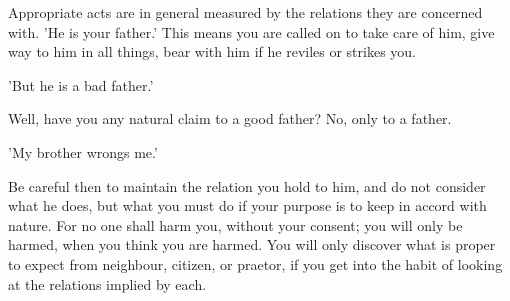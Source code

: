 Appropriate acts  are in general measured  by the relations they  are concerned
with. 'He is  your father.' This means you  are called on to take  care of him,
give way to him in all things, bear with him if he reviles or strikes you.

'But he is a bad father.'

Well, have you any natural claim to a good father? No, only to a father.

'My brother wrongs me.'

Be careful then to  maintain the relation you hold to him,  and do not consider
what he does,  but what you must do  if your purpose is to keep  in accord with
nature. For  no one  shall harm  you, without  your consent;  you will  only be
harmed, when you think you are harmed. You will only discover what is proper to
expect  from neighbour,  citizen, or  praetor,  if you  get into  the habit  of
looking at the relations implied by each.
